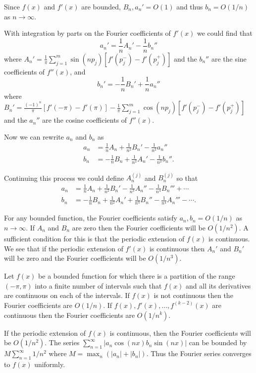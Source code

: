 Since $f(x)$ and $f'(x)$ are bounded, $B_n, a_n' = O(1)$ and thus
$b_n = O(1/n)$ as $n \to \infty$.

With integration by parts on the Fourier coefficients of $f'(x)$ we could
find that
\[ a_n' = \frac{1}{n} A_n' - \frac{1}{n} b_n'' \]
where $A_n' = \frac{1}{\pi} \sum_{j=1}^m \sin(n p_j)[f'(p_j^-)-f'(p_j^+)]$ and
the $b_n''$ are the sine coefficients of $f''(x)$, and
\[ b_n' = -\frac{1}{n} B_n' + \frac{1}{n} a_n'' \]
where $B_n' = \frac{(-1)^n}{\pi} [f'(-\pi) - f'(\pi)] - \frac{1}{\pi} 
\sum_{j=1}^m \cos(n p_j)
[f'(p_j^-)-f'(p_j^+)]$ and the $a_n''$ are the cosine coefficients of $f''(x)$.

Now we can rewrite $a_n$ and $b_n$ as
\begin{align*}
  a_n &= \frac{1}{n} A_n + \frac{1}{n^2} B_n' - \frac{1}{n^2} a_n'' \\
  b_n &= -\frac{1}{n} B_n + \frac{1}{n^2} A_n' - \frac{1}{n^2} b_n''.
\end{align*}

Continuing this process we could define $A_n^{(j)}$ and $B_n^{(j)}$ so that
\begin{align*}
  a_n &= \frac{1}{n} A_n + \frac{1}{n^2} B_n' - \frac{1}{n^3} A_n''
  - \frac{1}{n^4} B_n''' + \cdots \\
  b_n &= -\frac{1}{n} B_n + \frac{1}{n^2} A_n' + \frac{1}{n^3} B_n''
  - \frac{1}{n^4} A_n''' - \cdots. 
\end{align*} 




For any bounded function, the Fourier coefficients satisfy
$a_n, b_n = O(1/n)$ as $n \to \infty$.  If $A_n$ and $B_n$ are zero then the
Fourier coefficients will be $O(1/n^2)$.  A sufficient condition for this
is that the periodic extension of $f(x)$ is continuous. We see
that if the periodic extension of $f'(x)$ is continuous then $A_n'$ and 
$B_n'$ will be zero and the Fourier coefficients will be $O(1/n^3)$.


\begin{Result}
  Let $f(x)$ be a bounded function for which there is a partition of the 
  range $(-\pi, \pi)$ into a finite number of intervals such that $f(x)$ 
  and all its derivatives are continuous on each of the intervals.
  If $f(x)$ is not continuous then the Fourier coefficients are $O(1/n)$.
  If $f(x), f'(x), \ldots, f^{(k-2)}(x)$ are continuous then the Fourier
  coefficients are $O(1/n^k)$.
\end{Result}


If the periodic extension of $f(x)$ is continuous, then the Fourier 
coefficients will be $O(1/n^2)$.  The series 
$\sum_{n=1}^\infty |a_n \cos(n x) b_n \sin(n x)|$ can be bounded by
$M \sum_{n=1}^\infty 1/n^2$ where $M = { \displaystyle \max_{n} }
(|a_n| + |b_n|)$.  Thus 
the Fourier series converges to $f(x)$ uniformly.


